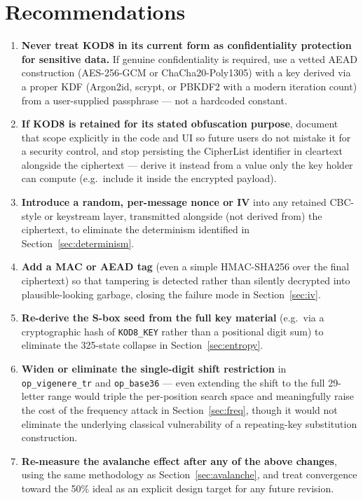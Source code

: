 \documentclass[11pt]{article}
\begin{document}
\section{Recommendations}
\label{sec:recommendations}

\begin{enumerate}[leftmargin=1.6em]
\item \textbf{Never treat KOD8 in its current form as confidentiality
protection for sensitive data.} If genuine confidentiality is required,
use a vetted AEAD construction (AES-256-GCM or ChaCha20-Poly1305) with a
key derived via a proper KDF (Argon2id, scrypt, or PBKDF2 with a modern
iteration count) from a user-supplied passphrase --- not a hardcoded
constant.
\item \textbf{If KOD8 is retained for its stated obfuscation purpose},
document that scope explicitly in the code and UI so future users do
not mistake it for a security control, and stop persisting the
CipherList identifier in cleartext alongside the ciphertext --- derive it
instead from a value only the key holder can compute (e.g.\ include it
inside the encrypted payload).
\item \textbf{Introduce a random, per-message nonce or IV} into any
retained CBC-style or keystream layer, transmitted alongside (not
derived from) the ciphertext, to eliminate the determinism identified
in Section~\ref{sec:determinism}.
\item \textbf{Add a MAC or AEAD tag} (even a simple HMAC-SHA256 over the
final ciphertext) so that tampering is detected rather than silently
decrypted into plausible-looking garbage, closing the failure mode in
Section~\ref{sec:iv}.
\item \textbf{Re-derive the S-box seed from the full key material}
(e.g.\ via a cryptographic hash of \texttt{KOD8\_KEY} rather than a
positional digit sum) to eliminate the 325-state collapse in
Section~\ref{sec:entropy}.
\item \textbf{Widen or eliminate the single-digit shift restriction} in
\texttt{op\_vigenere\_tr} and \texttt{op\_base36} --- even extending the
shift to the full 29-letter range would triple the per-position search
space and meaningfully raise the cost of the frequency attack in
Section~\ref{sec:freq}, though it would not eliminate the underlying
classical vulnerability of a repeating-key substitution construction.
\item \textbf{Re-measure the avalanche effect after any of the above
changes}, using the same methodology as Section~\ref{sec:avalanche},
and treat convergence toward the 50\% ideal as an explicit design
target for any future revision.
\end{enumerate}
\end{document}
